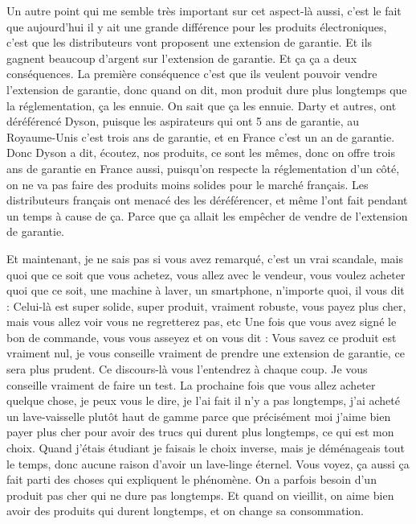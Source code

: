 \begin{small}
Un autre point qui me semble très important sur cet aspect-là aussi, c'est le fait que aujourd'hui il y ait une grande différence pour les produits électroniques, c'est que les distributeurs vont proposent une extension de garantie. Et ils gagnent beaucoup d'argent sur l'extension de garantie. Et ça ça a deux conséquences. La première conséquence c'est que ils veulent pouvoir vendre l'extension de garantie, donc quand on dit, mon produit dure plus longtemps que la réglementation, ça les ennuie. On sait que ça les ennuie. Darty et autres, ont déréférencé Dyson, puisque les aspirateurs qui ont 5 ans de garantie, au Royaume-Unis c'est trois ans de garantie, et en France c'est un an de garantie. Donc Dyson a dit, écoutez, nos produits, ce sont les mêmes, donc on offre trois ans de garantie en France aussi, puisqu'on respecte la réglementation d'un côté, on ne va pas faire des produits moins solides pour le marché français. Les distributeurs français ont menacé des les déréférencer, et même l'ont fait pendant un temps à cause de ça. Parce que ça allait les empêcher de vendre de l'extension de garantie. 

Et maintenant, je ne sais pas si vous avez remarqué, c'est un vrai scandale, mais quoi que ce soit que vous achetez, vous allez avec le vendeur, vous voulez acheter quoi que ce soit, une machine à laver, un smartphone, n'importe quoi, il vous dit : \og Celui-là est super solide, super produit, vraiment robuste, vous payez plus cher, mais vous allez voir vous ne regretterez pas, etc\fg{} Une fois que vous avez signé le bon de commande, vous vous asseyez et on vous dit : \og Vous savez ce produit est vraiment nul, je vous conseille vraiment de prendre une extension de garantie, ce sera plus prudent\fg{}. Ce discours-là vous l'entendrez à chaque coup. Je vous conseille vraiment de faire un test. La prochaine fois que vous allez acheter quelque chose, je peux vous le dire, je l'ai fait il n'y a pas longtemps, j'ai acheté un lave-vaisselle plutôt haut de gamme parce que précisément moi j'aime bien payer plus cher pour avoir des trucs qui durent plus longtemps, ce qui est mon choix. Quand j'étais étudiant je faisais le choix inverse, mais je déménageais tout le temps, donc aucune raison d'avoir un lave-linge éternel. Vous voyez, ça aussi ça fait parti des choses qui expliquent le phénomène. On a parfois besoin d'un produit pas cher qui ne dure pas longtemps. Et quand on vieillit, on aime bien avoir des produits qui durent longtemps, et on change sa consommation. 


\end{small}

